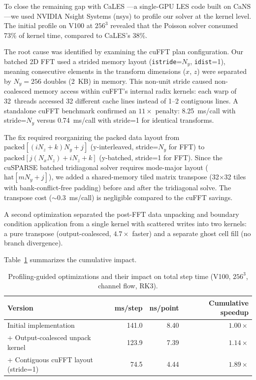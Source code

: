 To close the remaining gap with CaLES \citep{Xiao2024}---a single-GPU LES code built on CaNS---we used NVIDIA Nsight Systems (nsys) to profile our solver at the kernel level.
The initial profile on V100 at $256^3$ revealed that the Poisson solver consumed 73\% of kernel time, compared to CaLES's 38\%.

The root cause was identified by examining the cuFFT plan configuration.
Our batched 2D FFT used a strided memory layout (\texttt{istride}=$N_y$, \texttt{idist}=1), meaning consecutive elements in the transform dimensions ($x$, $z$) were separated by $N_y = 256$ doubles (2~KB) in memory.
This non-unit stride caused non-coalesced memory access within cuFFT's internal radix kernels: each warp of 32~threads accessed 32 different cache lines instead of 1--2 contiguous lines.
A standalone cuFFT benchmark confirmed an $11\times$ penalty: 8.25~ms/call with stride=$N_y$ versus 0.74~ms/call with stride=1 for identical transforms.

The fix required reorganizing the packed data layout from $\text{packed}[(i N_z + k) N_y + j]$ (y-interleaved, stride=$N_y$ for FFT) to $\text{packed}[j (N_x N_z) + i N_z + k]$ (y-batched, stride=1 for FFT).
Since the cuSPARSE batched tridiagonal solver requires mode-major layout ($\text{hat}[m N_y + j]$), we added a shared-memory tiled matrix transpose (32$\times$32 tiles with bank-conflict-free padding) before and after the tridiagonal solve.
The transpose cost ($\sim$0.3~ms/call) is negligible compared to the cuFFT savings.

A second optimization separated the post-FFT data unpacking and boundary condition application from a single kernel with scattered writes into two kernels: a pure transpose (output-coalesced, $4.7\times$ faster) and a separate ghost cell fill (no branch divergence).

Table~\ref{tab:optimization} summarizes the cumulative impact.

\begin{table}[htbp]
\centering
\caption{Profiling-guided optimizations and their impact on total step time (V100, $256^3$, channel flow, RK3).}
\label{tab:optimization}
\begin{tabular}{lrrr}
\toprule
Version & ms/step & ns/point & Cumulative speedup \\
\midrule
Initial implementation                 & 141.0 & 8.40 & $1.00\times$ \\
+ Output-coalesced unpack kernel       & 123.9 & 7.39 & $1.14\times$ \\
+ Contiguous cuFFT layout (stride=1)   & 74.5  & 4.44 & $1.89\times$ \\
\bottomrule
\end{tabular}
\end{table}

